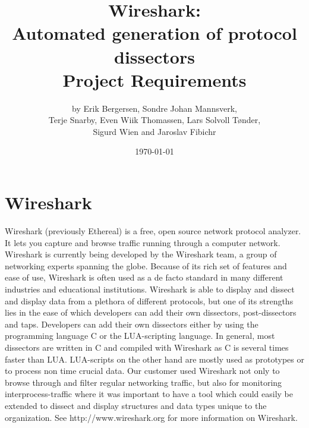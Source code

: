 \documentclass[a4paper, 11pt]{report}
\title{Wireshark:\\ Automated generation of protocol dissectors\\
		Project Requirements}
\author{by Erik Bergersen, Sondre Johan Mannsverk,\\ Terje Snarby,
		Even Wiik Thomassen, Lars Solvoll Tønder,\\ Sigurd Wien
		and Jaroslav Fibichr}
\date{\today}
\begin{document}
\section{Wireshark}
Wireshark (previously Ethereal) is a free, open source network protocol analyzer. It lets you capture and browse traffic running through a computer network. Wireshark is currently being developed by the Wireshark team, a group of networking experts spanning the globe. Because of its rich set of features and ease of use, Wireshark is often used as a de facto standard in many different industries and educational institutions. Wireshark is able to display and dissect and display data from a plethora of different protocols, but one of its strengths lies in the ease of which developers can add their own dissectors, post-dissectors and taps. Developers can add their own dissectors either by using the programming language C or the LUA-scripting language. In general, most dissectors are written in C and compiled with Wireshark as C is several times faster than LUA. LUA-scripts on the other hand are mostly used as prototypes or to process non time crucial data. Our customer used Wireshark not only to browse through and filter regular networking traffic, but also for monitoring interprocess-traffic where it was important to have a tool which could easily be extended to dissect and display structures and data types unique to the organization.
See http://www.wireshark.org for more information on Wireshark.
\end{document}

